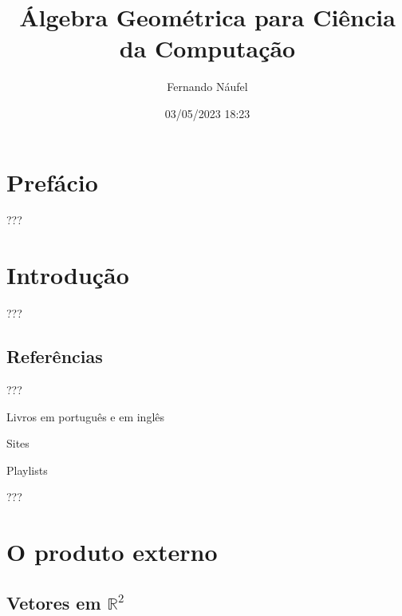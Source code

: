 \documentclass[
  letterpaper,
  DIV=11,
  numbers=noendperiod]{scrreprt}
\title{Álgebra Geométrica para Ciência da Computação}
\author{Fernando Náufel}
\date{03/05/2023 18:23}
\renewcommand*\contentsname{Índice}
\newcommand\contentsname{Índice}
\begin{document}
\maketitle


\ifdefined\Shaded\renewenvironment{Shaded}{\begin{tcolorbox}[boxrule=0pt, frame hidden, borderline west={3pt}{0pt}{shadecolor}, interior hidden, sharp corners, enhanced, breakable]}{\end{tcolorbox}}\fi

\renewcommand*\contentsname{Índice}
{
\hypersetup{linkcolor=}
\setcounter{tocdepth}{2}
\tableofcontents
}
\providecommand{\reais}{\mathbb{R}}
\providecommand{\vetor}[1]{\mathbf{#1}}
\providecommand{\ve}[1]{\vetor{e}_{#1}}

\hypertarget{prefuxe1cio}{%
\chapter*{Prefácio}\label{prefuxe1cio}}

???

\hypertarget{sec-intro}{%
\chapter{Introdução}\label{sec-intro}}

???

\hypertarget{referuxeancias}{%
\section{Referências}\label{referuxeancias}}

???

Livros em português e em inglês

Sites

Playlists

???

\providecommand{\reais}{\mathbb{R}}
\providecommand{\vetor}[1]{\mathbf{#1}}
\providecommand{\ve}[1]{\vetor{e}_{#1}}

\hypertarget{sec-prod-ext}{%
\chapter{O produto externo}\label{sec-prod-ext}}

\hypertarget{sec-vetores-r2}{%
\section{\texorpdfstring{Vetores em
$\mathbb{R}^2$}{Vetores em }}\label{sec-vetores-r2}}
\end{document}
